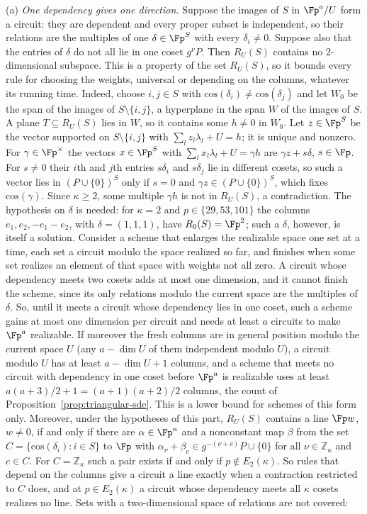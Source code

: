 \begin{remark}
\textup{(a)} \emph{One dependency gives one direction.} Suppose the images of $S$ in $\Fp^a/U$ form a circuit: they are dependent and every proper subset is independent, so their relations are the multiples of one $\delta\in\Fp^S$ with every $\delta_i\ne0$. Suppose also that the entries of $\delta$ do not all lie in one coset $g^\nu P$. Then $R_U(S)$ contains no $2$-dimensional subspace. This is a property of the set $R_U(S)$, so it bounds every rule for choosing the weights, universal or depending on the columns, whatever its running time. Indeed, choose $i,j\in S$ with $\mathrm{cos}(\delta_i)\ne\mathrm{cos}(\delta_j)$ and let $W_0$ be the span of the images of $S\setminus\{i,j\}$, a hyperplane in the span $W$ of the images of $S$. A plane $T\subseteq R_U(S)$ lies in $W$, so it contains some $h\ne0$ in $W_0$. Let $z\in\Fp^S$ be the vector supported on $S\setminus\{i,j\}$ with $\sum_l z_l\lambda_l+U=h$; it is unique and nonzero. For $\gamma\in\Fp^\times$ the vectors $x\in\Fp^S$ with $\sum_l x_l\lambda_l+U=\gamma h$ are $\gamma z+s\delta$, $s\in\Fp$. For $s\ne0$ their $i$th and $j$th entries $s\delta_i$ and $s\delta_j$ lie in different cosets, so such a vector lies in $(P\cup\{0\})^S$ only if $s=0$ and $\gamma z\in(P\cup\{0\})^S$, which fixes $\mathrm{cos}(\gamma)$. Since $\kappa\ge2$, some multiple $\gamma h$ is not in $R_U(S)$, a contradiction. The hypothesis on $\delta$ is needed: for $\kappa=2$ and $p\in\{29,53,101\}$ the columns $e_1,e_2,-e_1-e_2$, with $\delta=(1,1,1)$, have $R_0(S)=\Fp^2$; such a $\delta$, however, is itself a solution. Consider a scheme that enlarges the realizable space one set at a time, each set a circuit modulo the space realized so far, and finishes when some set realizes an element of that space with weights not all zero. A circuit whose dependency meets two cosets adds at most one dimension, and it cannot finish the scheme, since its only relations modulo the current space are the multiples of $\delta$. So, until it meets a circuit whose dependency lies in one coset, such a scheme gains at most one dimension per circuit and needs at least $a$ circuits to make $\Fp^a$ realizable. If moreover the fresh columns are in general position modulo the current space $U$ (any $a-\dim U$ of them independent modulo $U$), a circuit modulo $U$ has at least $a-\dim U+1$ columns, and a scheme that meets no circuit with dependency in one coset before $\Fp^a$ is realizable uses at least $a(a+3)/2+1=(a+1)(a+2)/2$ columns, the count of Proposition~\ref{prop:triangular-sde}. This is a lower bound for schemes of this form only. Moreover, under the hypotheses of this part, $R_U(S)$ contains a line $\Fp w$, $w\ne0$, if and only if there are $\alpha\in\Fp^{\kappa}$ and a nonconstant map $\beta$ from the set $C=\{\mathrm{cos}(\delta_i):i\in S\}$ to $\Fp$ with $\alpha_\nu+\beta_{c}\in g^{-(\nu+c)}P\cup\{0\}$ for all $\nu\in\mathbb{Z}_\kappa$ and $c\in C$. For $C=\mathbb{Z}_\kappa$ such a pair exists if and only if $p\notin E_2(\kappa)$. So rules that depend on the columns give a circuit a line exactly when a contraction restricted to $C$ does, and at $p\in E_2(\kappa)$ a circuit whose dependency meets all $\kappa$ cosets realizes no line. Sets with a two-dimensional space of relations are not covered: 
\end{remark}
